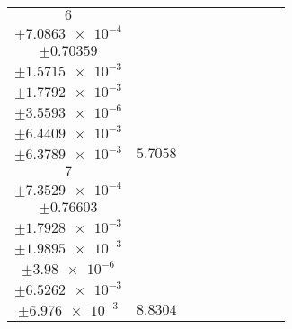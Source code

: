 \documentclass[8pt]{article}
\begin{document}
\begin{longtable}[l]{c c c c c c c c c}
$\num{6}$ & \begin{tabular}[c]{@{}c@{}}$\num{3.7413e-2}$ \\ $\pm\num{7.0863e-4}$\end{tabular} & \begin{tabular}[c]{@{}c@{}}$\num{0.92709}$ \\ $\pm\num{0.70359}$\end{tabular} & \begin{tabular}[c]{@{}c@{}}$\num{3.5559}$ \\ $\pm\num{1.5715e-3}$\end{tabular} & \begin{tabular}[c]{@{}c@{}}$\num{4.0486e+3}$ \\ $\pm\num{1.7792e-3}$\end{tabular} & \begin{tabular}[c]{@{}c@{}}$\num{8.0994}$ \\ $\pm\num{3.5593e-6}$\end{tabular} & \begin{tabular}[c]{@{}c@{}}$\num{0.6615}$ \\ $\pm\num{6.4409e-3}$\end{tabular} & \begin{tabular}[c]{@{}c@{}}$\num{0.65005}$ \\ $\pm\num{6.3789e-3}$\end{tabular} & $\num{5.7058}$\\
$\num{7}$ & \begin{tabular}[c]{@{}c@{}}$\num{4.1216e-2}$ \\ $\pm\num{7.3529e-4}$\end{tabular} & \begin{tabular}[c]{@{}c@{}}$\num{-0.59147}$ \\ $\pm\num{0.76603}$\end{tabular} & \begin{tabular}[c]{@{}c@{}}$\num{4.3359}$ \\ $\pm\num{1.7928e-3}$\end{tabular} & \begin{tabular}[c]{@{}c@{}}$\num{4.0493e+3}$ \\ $\pm\num{1.9895e-3}$\end{tabular} & \begin{tabular}[c]{@{}c@{}}$\num{8.1009}$ \\ $\pm\num{3.98e-6}$\end{tabular} & \begin{tabular}[c]{@{}c@{}}$\num{0.90164}$ \\ $\pm\num{6.5262e-3}$\end{tabular} & \begin{tabular}[c]{@{}c@{}}$\num{0.79114}$ \\ $\pm\num{6.976e-3}$\end{tabular} & $\num{8.8304}$\\

\end{longtable}
\end{document}
